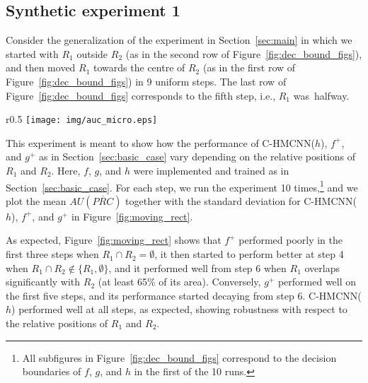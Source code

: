 \documentclass{article}
\newcommand{\system}[1]{C-HMCNN(#1)}
\newcommand{\auprc}{$AU(\overline{PRC}) $}
\begin{document}
\subsection{Synthetic experiment 1}
Consider the generalization of the experiment  in Section~\ref{sec:main} in which we started with $R_1$ outside $R_2$ (as in the second row of Figure~\ref{fig:dec_bound_figs}), and then moved $R_1$ towards the centre of $R_2$ (as in the first row of  Figure~\ref{fig:dec_bound_figs}) in 9 uniform steps.
The last row of  Figure~\ref{fig:dec_bound_figs} corresponds to the fifth step, i.e., $R_1$ was~halfway.
\begin{wrapfigure}{r}{0.5\textwidth}
     \vspace{-.5cm}
    \centering
    \texttt{[image: img/auc\_micro.eps]}
    \caption{Mean {\auprc} with standard deviation of \system{$h$}, $f^+$, and $g^+$ for each step.\label{fig:moving_rect}}
    \vspace{-.45cm}
\end{wrapfigure}
This experiment is meant to show how the performance of \system{$h$},  $f^+$, and $g^+$ as in Section~\ref{sec:basic_case}
vary depending on the relative positions of $R_1$ and $R_2$. Here, 
$f$, $g$, and $h$ were implemented and trained as 
in Section~\ref{sec:basic_case}. For each step, we run the experiment 10 times,\footnote{All subfigures in Figure~\ref{fig:dec_bound_figs} correspond to the decision boundaries of $f$, $g$, and $h$ in the first of the 10 runs. } and we plot the mean \auprc{} together with the standard deviation for \system{$h$}, $f^+$, and $g^+$ in Figure~\ref{fig:moving_rect}.


As expected, Figure~\ref{fig:moving_rect} shows that $f^+$ performed poorly in the first three steps when $R_1 \cap R_2 = \emptyset$, it then started to perform better at step 4 when $R_1 \cap R_2 \not \in \{R_1, \emptyset\}$, and it performed well from step 6 when $R_1$ overlaps significantly with $R_2$ (at least 65\% of its area). Conversely, $g^+$ performed well on the first five steps, and its performance started decaying from step 6. \system{$h$} performed well at all steps, as expected, showing robustness with respect to the relative positions of $R_1$ and $R_2$. 
\end{document}

